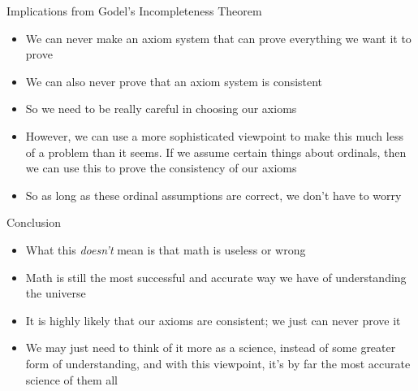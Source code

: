 \documentclass{beamer}
\begin{document}
\begin{frame}{Implications from Godel's Incompleteness Theorem}
\begin{itemize}
\item We can never make an axiom system that can prove everything we want it to prove
\item We can also never prove that an axiom system is consistent
\item So we need to be really careful in choosing our axioms
\item However, we can use a more sophisticated viewpoint to make this much less of a problem than it seems. If we assume certain things about ordinals, then we can use this to prove the consistency of our axioms
\item So as long as these ordinal assumptions are correct, we don't have to worry
\end{itemize}
\end{frame}

\begin{frame}{Conclusion}
\begin{itemize}
\item What this \textit{doesn't} mean is that math is useless or wrong
\item Math is still the most successful and accurate way we have of understanding the universe
\item It is highly likely that our axioms are consistent; we just can never prove it
\item We may just need to think of it more as a science, instead of some greater form of understanding, and with this viewpoint, it's by far the most accurate science of them all
\end{itemize}
\end{frame}
\end{document}
